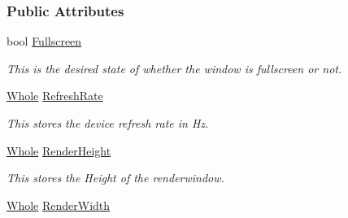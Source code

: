 \subsubsection*{Public Attributes}
\begin{DoxyCompactItemize}
\item 
\hypertarget{structphys_1_1GraphicsSettings_a64e9751b921685cac320650bd54e0a8e}{
bool \hyperlink{structphys_1_1GraphicsSettings_a64e9751b921685cac320650bd54e0a8e}{Fullscreen}}
\label{structphys_1_1GraphicsSettings_a64e9751b921685cac320650bd54e0a8e}

\begin{DoxyCompactList}\small\item\em This is the desired state of whether the window is fullscreen or not. \item\end{DoxyCompactList}\item 
\hypertarget{structphys_1_1GraphicsSettings_a510b666656f7d50532e9e8b37c3c429e}{
\hyperlink{namespacephys_a460f6bc24c8dd347b05e0366ae34f34a}{Whole} \hyperlink{structphys_1_1GraphicsSettings_a510b666656f7d50532e9e8b37c3c429e}{RefreshRate}}
\label{structphys_1_1GraphicsSettings_a510b666656f7d50532e9e8b37c3c429e}

\begin{DoxyCompactList}\small\item\em This stores the device refresh rate in Hz. \item\end{DoxyCompactList}\item 
\hypertarget{structphys_1_1GraphicsSettings_a82fe053e6276e29fbf473c3854bd4265}{
\hyperlink{namespacephys_a460f6bc24c8dd347b05e0366ae34f34a}{Whole} \hyperlink{structphys_1_1GraphicsSettings_a82fe053e6276e29fbf473c3854bd4265}{RenderHeight}}
\label{structphys_1_1GraphicsSettings_a82fe053e6276e29fbf473c3854bd4265}

\begin{DoxyCompactList}\small\item\em This stores the Height of the renderwindow. \item\end{DoxyCompactList}\item 
\hypertarget{structphys_1_1GraphicsSettings_a34226592a7e1ce7b0a2036afed00f239}{
\hyperlink{namespacephys_a460f6bc24c8dd347b05e0366ae34f34a}{Whole} \hyperlink{structphys_1_1GraphicsSettings_a34226592a7e1ce7b0a2036afed00f239}{RenderWidth}}
\label{structphys_1_1GraphicsSettings_a34226592a7e1ce7b0a2036afed00f239}


\end{DoxyCompactItemize}
